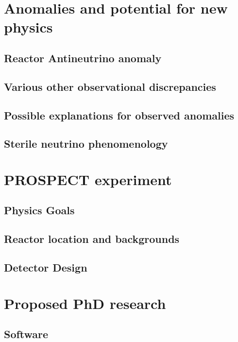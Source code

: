\documentclass[11pt]{article}
\begin{document}
\section{Anomalies and potential for new physics}

\subsection{Reactor Antineutrino anomaly }

\subsection{Various other observational discrepancies}

\subsection{Possible explanations for observed anomalies}

\subsection{Sterile neutrino phenomenology}

\section{PROSPECT experiment}

\cite{2013arXiv1309.7647A}

\subsection{Physics Goals}

\subsection{Reactor location and backgrounds}

\subsection{Detector Design}

\section{Proposed PhD research}

\subsection{Software}
\end{document}
